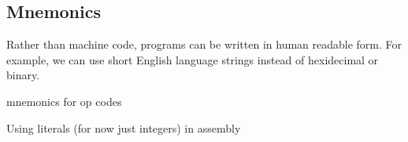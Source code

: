
\subsection{Mnemonics}

Rather than machine code, programs can be written in human readable form. For example, we can use short English language strings instead of hexidecimal or binary.



mnemonics for op codes


Using literals (for now just integers) in assembly

